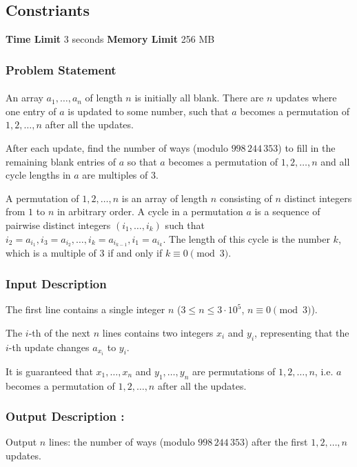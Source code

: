 \documentclass{article}
\begin{document}
\subsection*{Constriants}
\textbf{Time Limit}
3 seconds
\hfill
\textbf{Memory Limit}
256 MB
\subsubsection*{Problem Statement}
\paragraph{}An array $a_1,\dots,a_n$ of length $n$ is initially all blank. There are $n$ updates where one entry of $a$ is updated to some number, such that $a$ becomes a permutation of $1,2,\dots,n$ after all the updates.

After each update, find the number of ways (modulo $998\,244\,353$) to fill in the remaining blank entries of $a$ so that $a$ becomes a permutation of $1,2,\dots,n$ and all cycle lengths in $a$ are multiples of $3$.

A permutation of $1,2,\dots,n$ is an array of length $n$ consisting of $n$ distinct integers from $1$ to $n$ in arbitrary order. A cycle in a permutation $a$ is a sequence of pairwise distinct integers $(i_1,\dots,i_k)$ such that $i_2 = a_{i_1},i_3 = a_{i_2},\dots,i_k = a_{i_{k-1}},i_1 = a_{i_k}$. The length of this cycle is the number $k$, which is a multiple of $3$ if and only if $k \equiv 0 \pmod 3$.
\paragraph{}
\subsubsection*{Input Description}The first line contains a single integer $n$ ($3 \le n \le 3 \cdot 10^5$, $n \equiv 0 \pmod 3$).

The $i$-th of the next $n$ lines contains two integers $x_i$ and $y_i$, representing that the $i$-th update changes $a_{x_i}$ to $y_i$.

It is guaranteed that $x_1,\dots,x_n$ and $y_1,\dots,y_n$ are permutations of $1,2,\dots,n$, i.e. $a$ becomes a permutation of $1,2,\dots,n$ after all the updates.
\paragraph{}
\subsubsection*{Output Description : }Output $n$ lines: the number of ways (modulo $998\,244\,353$) after the first $1,2,\dots,n$ updates.
\end{document}
